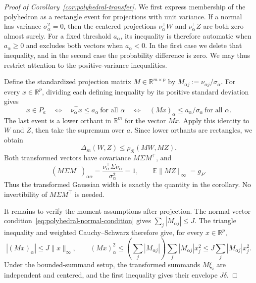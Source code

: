 \documentclass[11pt,letterpaper]{article}
\theoremstyle{remark}
\newcommand{\E}{\mathbb E}
\newcommand{\R}{\mathbb R}
\newcommand{\rh}{\rho_{\mathcal R}}
\begin{document}
\begin{proof}[Proof of Corollary~\ref{cor:polyhedral-transfer}]
We first express membership of the polyhedron as a rectangle event
for projections with unit variance. If a normal has variance
$\sigma_\alpha^2=0$, then the centered projections
$\nu_\alpha^\top W$ and $\nu_\alpha^\top Z$ are both zero almost surely.
For a fixed threshold $a_\alpha$, its inequality is therefore automatic
when $a_\alpha\ge0$ and excludes both vectors when $a_\alpha<0$.
In the first case we delete that inequality, and in the second case
the probability difference is zero. We may thus restrict attention
to the positive-variance inequalities.

Define the standardized projection matrix $M\in\R^{m\times p}$ by
$M_{\alpha j}:=\nu_{\alpha j}/\sigma_\alpha$.
For every $x\in\R^p$, dividing each defining inequality by its
positive standard deviation gives
\[
 x\in P_a
 \quad\Longleftrightarrow\quad
 \nu_\alpha^\top x\le a_\alpha\ \text{for all }\alpha
 \quad\Longleftrightarrow\quad
 (Mx)_\alpha\le a_\alpha/\sigma_\alpha\ \text{for all }\alpha.
\]
The last event is a lower orthant in $\R^m$ for the vector $Mx$.
Apply this identity to $W$ and $Z$, then take the supremum over $a$.
Since lower orthants are rectangles, we obtain
\begin{equation}
 \Delta_m(W,Z)\le\rh(MW,MZ).
 \label{eq:polyhedral-transfer}
\end{equation}
Both transformed vectors have covariance $M\Sigma M^\top$, and
\[
 (M\Sigma M^\top)_{\alpha\alpha}
 =\frac{\nu_\alpha^\top\Sigma\nu_\alpha}{\sigma_\alpha^2}=1,
 \qquad \E\|MZ\|_\infty=g_P.
\]
Thus the transformed Gaussian width is exactly the quantity in the
corollary. No invertibility of $M\Sigma M^\top$ is needed.

It remains to verify the moment assumptions after projection.
The normal-vector condition~\eqref{eq:polyhedral-normal-condition}
gives $\sum_j|M_{\alpha j}|\le J$.
The triangle inequality and weighted Cauchy--Schwarz therefore give,
for every $x\in\R^p$,
\[
 |(Mx)_\alpha|\le J\|x\|_\infty,
 \qquad
 (Mx)_\alpha^2
 \le\left(\sum_j|M_{\alpha j}|\right)
           \sum_j|M_{\alpha j}|x_j^2
 \le J\sum_j|M_{\alpha j}|x_j^2.
\]
Under the bounded-summand setup, the transformed summands $M\xi_i$
are independent and centered, and the first inequality gives their
envelope $J\delta$.


\end{proof}
\end{document}
